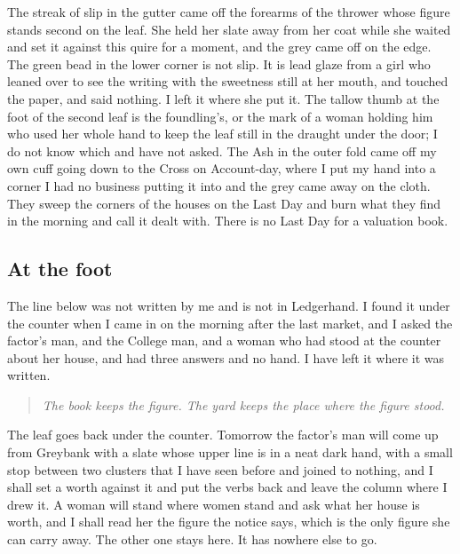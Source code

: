 \documentclass{design/chronicle}
\begin{document}
The streak of slip in the gutter came off the forearms of the thrower whose figure stands second on the leaf. She held her slate away from her coat while she waited and set it against this quire for a moment, and the grey came off on the edge. The green bead in the lower corner is not slip. It is lead glaze from a girl who leaned over to see the writing with the sweetness still at her mouth, and touched the paper, and said nothing. I left it where she put it. The tallow thumb at the foot of the second leaf is the foundling’s, or the mark of a woman holding him who used her whole hand to keep the leaf still in the draught under the door; I do not know which and have not asked. The Ash in the outer fold came off my own cuff going down to the Cross on Account-day, where I put my hand into a corner I had no business putting it into and the grey came away on the cloth. They sweep the corners of the houses on the Last Day and burn what they find in the morning and call it dealt with. There is no Last Day for a valuation book.

\subsection*{At the foot}

The line below was not written by me and is not in Ledgerhand. I found it under the counter when I came in on the morning after the last market, and I asked the factor’s man, and the College man, and a woman who had stood at the counter about her house, and had three answers and no hand. I have left it where it was written.

\begin{quote}\itshape The book keeps the figure. The yard keeps the place where the figure stood.\end{quote}

The leaf goes back under the counter. Tomorrow the factor’s man will come up from Greybank with a slate whose upper line is in a neat dark hand, with a small stop between two clusters that I have seen before and joined to nothing, and I shall set a worth against it and put the verbs back and leave the column where I drew it. A woman will stand where women stand and ask what her house is worth, and I shall read her the figure the notice says, which is the only figure she can carry away. The other one stays here. It has nowhere else to go.
\end{document}
